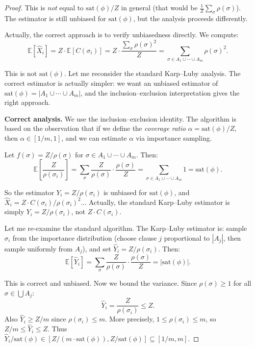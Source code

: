\documentclass[twoside,12pt]{book}
\theoremstyle{plain}
\theoremstyle{definition}
\theoremstyle{remark}
\begin{document}
\begin{proof}
This is \emph{not} equal to $\text{sat}(\phi)/Z$ in general (that would be $\frac{1}{Z} \sum_\sigma \rho(\sigma)$). The estimator is still unbiased for $\text{sat}(\phi)$, but the analysis proceeds differently.

Actually, the correct approach is to verify unbiasedness directly. We compute:
\[
\mathbb{E}[\hat{X}_i] = Z \cdot \mathbb{E}[C(\sigma_i)] = Z \cdot \frac{\sum_\sigma \rho(\sigma)^2}{Z} = \sum_{\sigma \in A_1 \cup \cdots \cup A_m} \rho(\sigma)^2.
\]

This is not $\text{sat}(\phi)$. Let me reconsider the standard Karp--Luby analysis. The correct estimator is actually simpler: we want an unbiased estimator of $\text{sat}(\phi) = |A_1 \cup \cdots \cup A_m|$, and the inclusion--exclusion interpretation gives the right approach.

\textbf{Correct analysis.} We use the inclusion--exclusion identity. The algorithm is based on the observation that if we define the \emph{coverage ratio} $\alpha = \text{sat}(\phi)/Z$, then $\alpha \in [1/m, 1]$, and we can estimate $\alpha$ via importance sampling.

Let $f(\sigma) = Z/\rho(\sigma)$ for $\sigma \in A_1 \cup \cdots \cup A_m$. Then:
\[
\mathbb{E}\!\left[\frac{Z}{\rho(\sigma_i)}\right] = \sum_{\sigma} \frac{Z}{\rho(\sigma)} \cdot \frac{\rho(\sigma)}{Z} = \sum_{\sigma \in A_1 \cup \cdots \cup A_m} 1 = \text{sat}(\phi).
\]

So the estimator $Y_i = Z/\rho(\sigma_i)$ is unbiased for $\text{sat}(\phi)$, and $\hat{X}_i = Z \cdot C(\sigma_i) / \rho(\sigma_i)^2$... Actually, the standard Karp--Luby estimator is simply $Y_i = Z/\rho(\sigma_i)$, not $Z \cdot C(\sigma_i)$.

Let me re-examine the standard algorithm. The Karp--Luby estimator is: sample $\sigma_i$ from the importance distribution (choose clause $j$ proportional to $|A_j|$, then sample uniformly from $A_j$), and set $\hat{Y}_i = Z/\rho(\sigma_i)$. Then:
\[
\mathbb{E}[\hat{Y}_i] = \sum_\sigma \frac{Z}{\rho(\sigma)} \cdot \frac{\rho(\sigma)}{Z} = |\text{sat}(\phi)|.
\]

This is correct and unbiased. Now we bound the variance. Since $\rho(\sigma) \geq 1$ for all $\sigma \in \bigcup A_j$:
\[
\hat{Y}_i = \frac{Z}{\rho(\sigma_i)} \leq Z.
\]
Also $\hat{Y}_i \geq Z/m$ since $\rho(\sigma_i) \leq m$. More precisely, $1 \leq \rho(\sigma_i) \leq m$, so $Z/m \leq \hat{Y}_i \leq Z$. Thus $\hat{Y}_i / \text{sat}(\phi) \in [Z/(m \cdot \text{sat}(\phi)), Z/\text{sat}(\phi)] \subseteq [1/m, m]$.


\end{proof}
\end{document}
